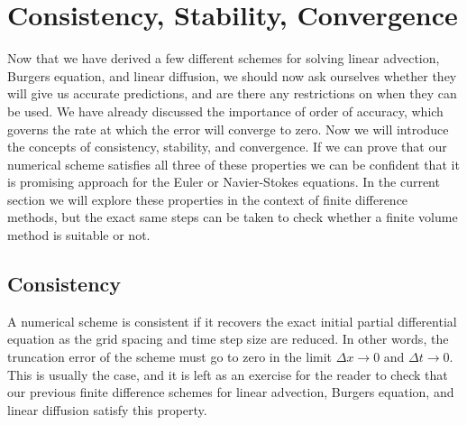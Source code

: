 \chapter{Consistency, Stability, Convergence}
Now that we have derived a few different schemes for solving linear advection, Burgers equation, and linear diffusion, we should now ask ourselves whether they will give us accurate predictions, and are there any restrictions on when they can be used. We have already discussed the importance of order of accuracy, which governs the rate at which the error will converge to zero. Now we will introduce the concepts of consistency, stability, and convergence. If we can prove that our numerical scheme satisfies all three of these properties we can be confident that it is promising approach for the Euler or Navier-Stokes equations. In the current section we will explore these properties in the context of finite difference methods, but the exact same steps can be taken to check whether a finite volume method is suitable or not.

\section{Consistency}
A numerical scheme is consistent if it recovers the exact initial partial differential equation as the grid spacing and time step size are reduced. In other words, the truncation error of the scheme must go to zero in the limit $\Delta x \rightarrow 0$ and $\Delta t \rightarrow 0$. This is usually the case, and it is left as an exercise for the reader to check that our previous finite difference schemes for linear advection, Burgers equation, and linear diffusion satisfy this property. 


